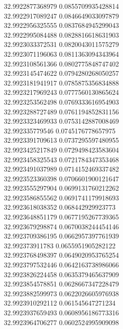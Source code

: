 {32.9922877368979	0.0855709935428814\\
32.9922917089247	0.0846649033097879\\
32.9922956325555	0.0837684945299043\\
32.9922995084488	0.0828816618631903\\
32.9923033372531	0.0820043011575279\\
32.9923071196063	0.0811363094343964\\
32.9923108561366	0.0802775848747402\\
32.9923145474622	0.0794280268050257\\
32.9923181941917	0.0785875356834888\\
32.9923217969243	0.0777560130865624\\
32.9923253562498	0.0769333616954903\\
32.9923288727489	0.0761194852831156\\
32.9923323469933	0.0753142887008469\\
32.992335779546	0.0745176778657975\\
32.9923391709613	0.0737295597480955\\
32.9923425217849	0.0729498423583604\\
32.9923458325543	0.0721784347353468\\
32.9923491037989	0.0714152469337482\\
32.9923523360398	0.0706601900121647\\
32.9923555297904	0.0699131760212262\\
32.9923586855562	0.0691741179918693\\
32.9923618038352	0.068442929923773\\
32.9923648851179	0.0677195267739365\\
32.9923679298874	0.0670038244454146\\
32.9923709386195	0.0662957397761939\\
32.992373911783	0.0655951905282122\\
32.9923768498397	0.0649020953765254\\
32.9923797532446	0.0642163738986066\\
32.9923826224458	0.0635379465637909\\
32.9923854578851	0.0628667347228479\\
32.9923882599973	0.0622026605976938\\
32.9923910292112	0.061545647271234\\
32.9923937659493	0.0608956186773316\\
32.9923964706277	0.0602524995909098\\
}
